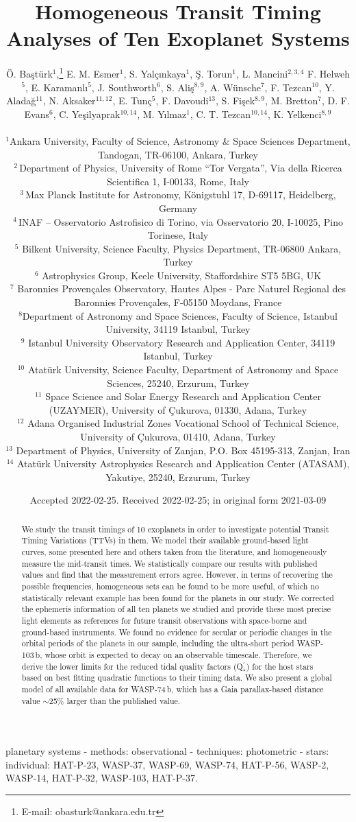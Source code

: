 \documentclass[a4paper,fleqn,usenatbib]{mnras}
\title[TTV Analyses of Ten Systems]{Homogeneous Transit Timing Analyses of Ten Exoplanet Systems}
\author[Ba\c{s}t\"urk et al.]{
\"O. Ba\c{s}t\"urk$^{1}$,\thanks{E-mail: obasturk@ankara.edu.tr}
E. M. Esmer$^{1}$,
S. Yal\c{c}{\i}nkaya$^{1}$,
\c{S}. Torun$^{1}$,
L. Mancini$^{2,3,4}$
\newauthor
F. Helweh$^{5}$,
E. Karamanl{\i}$^{5}$,
J. Southworth$^{6}$,
S. Ali\c{s}$^{8,9}$,
A. W\"unsche$^{7}$,
F. Tezcan$^{10}$,
\newauthor
Y. Alada\u{g}$^{11}$,
N. Aksaker$^{11,12}$,
E. Tun\c{c}$^{5}$,
F. Davoudi$^{13}$,
S. Fi\c{s}ek$^{8,9}$,
M. Bretton$^{7}$,
\newauthor
D. F. Evans$^{6}$,
C. Ye\c{s}ilyaprak$^{10,14}$,
M. Y{\i}lmaz$^{1}$,
C. T. Tezcan$^{10,14}$,
K. Yelkenci$^{8,9}$
\\
\\
$^{1}$Ankara University, Faculty of Science, Astronomy \& Space Sciences Department, Tandogan, TR-06100, Ankara, Turkey\\
$^{2}$\,Department of Physics, University of Rome ``Tor Vergata'', Via
della Ricerca Scientifica 1, I-00133, Rome, Italy \\
$^{3}$\,Max Planck Institute for Astronomy, K\"{o}nigstuhl 17,
D-69117, Heidelberg, Germany \\
$^{4}$\,INAF -- Osservatorio Astrofisico di Torino, via Osservatorio
20, I-10025, Pino Torinese, Italy \\
$^{5}$ Bilkent University, Science Faculty, Physics Department, TR-06800 Ankara, Turkey \\
$^{6}$ Astrophysics Group, Keele University, Staffordshire ST5 5BG, UK \\
$^{7}$ Baronnies Proven\c{c}ales Observatory, Hautes Alpes - Parc Naturel
Regional des Baronnies Proven\c{c}ales, F-05150 Moydans, France \\
$^{8}$Department of Astronomy and Space Sciences, Faculty of Science, Istanbul University, 34119 Istanbul, Turkey \\
$^{9}$ Istanbul University Observatory Research and Application Center, 34119 Istanbul, Turkey \\
$^{10}$ Atat\"urk University, Science Faculty, Department of Astronomy and Space Sciences, 25240, Erzurum, Turkey \\
$^{11}$ Space Science and Solar Energy Research and Application Center (UZAYMER), University of \c{C}ukurova, 01330, Adana, Turkey\\
$^{12}$ Adana Organised Industrial Zones Vocational School of Technical Science, University of \c{C}ukurova, 01410, Adana, Turkey\\
$^{13}$ Department of Physics, University of Zanjan, P.O. Box 45195-313, Zanjan, Iran\\
$^{14}$ Atat\"urk University Astrophysics Research and Application Center (ATASAM), Yakutiye, 25240, Erzurum, Turkey 
}
\date{Accepted 2022-02-25. Received 2022-02-25; in original form 2021-03-09}
\begin{document}
\label{firstpage}
\pagerange{\pageref{firstpage}--\pageref{lastpage}}
\maketitle

\begin{abstract}
  We study the transit timings of 10 exoplanets in order to investigate potential Transit Timing Variations (TTVs) in them. We model their available ground-based light curves, some presented here and others taken from the literature, and homogeneously measure the mid-transit times. We statistically compare our results with published values and find that the measurement errors agree. However, in terms of recovering the possible frequencies, homogeneous sets can be found to be more useful, of which no statistically relevant example has been found for the planets in our study. We corrected the ephemeris information of all ten planets we studied and provide these most precise light elements as references for future transit observations with space-borne and ground-based instruments. We found no evidence for secular or periodic changes in the orbital periods of the planets in our sample, including the ultra-short period WASP-103\,b, whose orbit is expected to decay on an observable timescale. Therefore, we derive the lower limits for the reduced tidal quality factors (Q$^{\prime}_{\star}$) for the host stars based on best fitting quadratic functions to their timing data. We also present a global model of all available data for WASP-74\,b, which has a Gaia parallax-based distance value $\sim$25\% larger than the published value.
\end{abstract}

\begin{keywords}
planetary systems - methods: observational - techniques: photometric - stars: individual: HAT-P-23, WASP-37, WASP-69, WASP-74, HAT-P-56, WASP-2, WASP-14, HAT-P-32, WASP-103, HAT-P-37.
\end{keywords}


\end{document}
